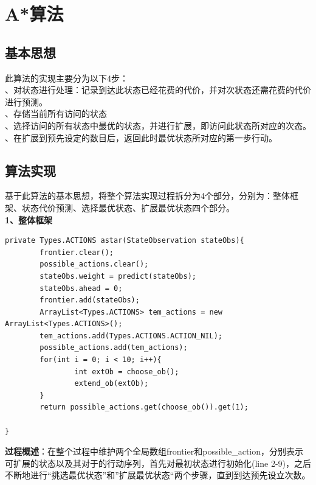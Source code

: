 \documentclass[UTF8]{article}
\begin{document}
\section{A*算法}

\subsection{基本思想}
\noindent 此算法的实现主要分为以下4步：\\
、对状态进行处理：记录到达此状态已经花费的代价，并对次状态还需花费的代价进行预测。\\
、存储当前所有访问的状态\\
、选择访问的所有状态中最优的状态，并进行扩展，即访问此状态所对应的次态。\\
、在扩展到预先设定的数目后，返回此时最优状态所对应的第一步行动。\\

\subsection{算法实现}
\indent 基于此算法的基本思想，将整个算法实现过程拆分为4个部分，分别为：整体框架、状态代价预测、选择最优状态、扩展最优状态四个部分。\\
\indent\textbf{1、整体框架}
\begin{lstlisting}[caption=整体框架]
private Types.ACTIONS astar(StateObservation stateObs){
		frontier.clear();
		possible_actions.clear();
		stateObs.weight = predict(stateObs);
		stateObs.ahead = 0;
		frontier.add(stateObs);
		ArrayList<Types.ACTIONS> tem_actions = new ArrayList<Types.ACTIONS>();
		tem_actions.add(Types.ACTIONS.ACTION_NIL);
		possible_actions.add(tem_actions);
		for(int i = 0; i < 10; i++){   
				int extOb = choose_ob();  
				extend_ob(extOb);         
		}
		return possible_actions.get(choose_ob()).get(1); 

}
\end{lstlisting}
\noindent\textbf{过程概述}：在整个过程中维护两个全局数组frontier和possible\_action，分别表示可扩展的状态以及其对于的行动序列，首先对最初状态进行初始化(line 2-9)，之后不断地进行“挑选最优状态”和”扩展最优状态“两个步骤，直到到达预先设立次数。\\
\end{document}

